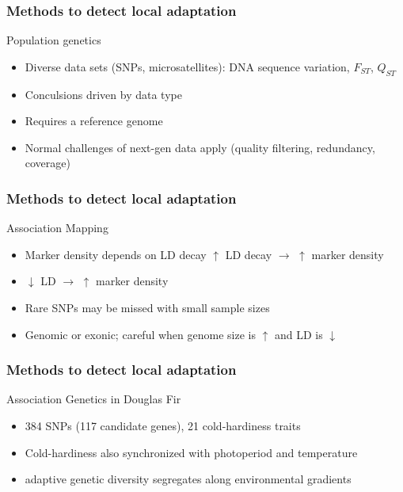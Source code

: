 \begin{frame}
\frametitle{Methods to detect local adaptation}
\begin{block}{Population genetics}
\begin{itemize}
\item{Diverse data sets (SNPs, microsatellites): DNA sequence variation,
$F_{ST}$, $Q_{ST}$}
\item{Conculsions driven by data type}
\item{Requires a reference genome}
\item{Normal challenges of next-gen data apply (quality filtering, redundancy,
coverage)}
\end{itemize}
\end{block}
\end{frame}


\begin{frame}
\frametitle{Methods to detect local adaptation}
\begin{block}{Association Mapping}
\begin{itemize}
\item{Marker density depends on LD decay $\uparrow$ LD decay $\rightarrow$
$\uparrow$ marker density}
\item{$\downarrow$ LD  $\rightarrow$ $\uparrow$ marker density}
\item{Rare SNPs may be missed with small sample sizes}
\item{Genomic or exonic; careful when genome size is $\uparrow$ and LD is
$\downarrow$}
\end{itemize}

\end{block}
\end{frame}

\begin{frame}
\frametitle{Methods to detect local adaptation}
\begin{block}{Association Genetics in Douglas Fir \citep{Eckert:2009hha}}
\begin{itemize}
\item{384 SNPs (117 candidate genes), 21 cold-hardiness traits}
\item{Cold-hardiness also synchronized with photoperiod and temperature}
\item{adaptive genetic diversity segregates along environmental gradients}
\end{itemize}
\end{block}
\end{frame}

